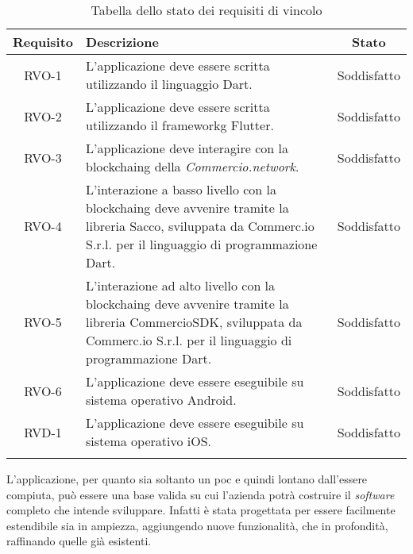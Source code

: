 \begin{longtable}{|c|p{8.35cm}|c|}
	\hline
	\rowcolor{gray}
	\textbf{Requisito} & \textbf{Descrizione} & \textbf{Stato} \\
	\hline
	RVO-1    & L'applicazione deve essere scritta utilizzando il linguaggio Dart. & Soddisfatto \\
	\hline
	RVO-2    & L'applicazione deve essere scritta utilizzando il \gls{frameworkg} Flutter. & Soddisfatto \\
	\hline
	RVO-3    & L'applicazione deve interagire con la \gls{blockchaing} della \textit{Commercio.network}. & Soddisfatto \\
	\hline
	RVO-4    & L'interazione a basso livello con la \gls{blockchaing} deve avvenire tramite la libreria Sacco, sviluppata da Commerc.io S.r.l. per il linguaggio di programmazione Dart. & Soddisfatto \\
	\hline
	RVO-5    & L'interazione ad alto livello con la \gls{blockchaing} deve avvenire tramite la libreria CommercioSDK, sviluppata da Commerc.io S.r.l. per il linguaggio di programmazione Dart. & Soddisfatto \\
	\hline
	RVO-6    & L'applicazione deve essere eseguibile su sistema operativo Android. & Soddisfatto \\
	\hline
	RVD-1    & L'applicazione deve essere eseguibile su sistema operativo iOS. & Soddisfatto \\
	\hline
	
	\caption{Tabella dello stato dei requisiti di vincolo}
	\label{tab:stato-requisiti-vincolo}
\end{longtable}

L'applicazione, per quanto sia soltanto un \gls{poc} e quindi lontano dall'essere compiuta, può essere una base valida su cui l'azienda potrà costruire il \textit{software} completo che intende sviluppare. Infatti è stata progettata per essere facilmente estendibile sia in ampiezza, aggiungendo nuove funzionalità, che in profondità, raffinando quelle già esistenti. 